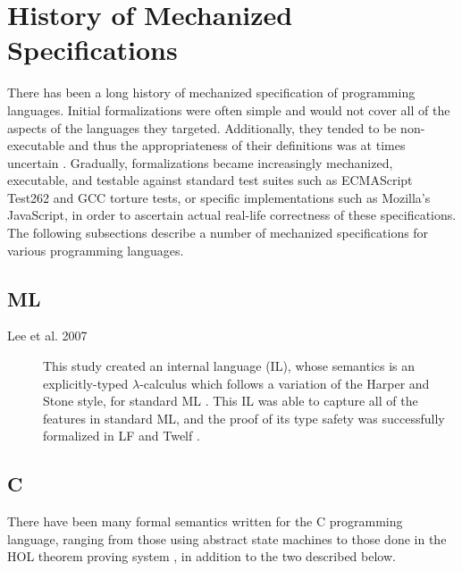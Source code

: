 \documentclass[a4paper,11pt,twoside]{report}
\begin{document}
\section{History of Mechanized Specifications}\label{sec:hist}
There has been a long history of mechanized specification of programming languages. Initial formalizations were often simple and would not cover all of the aspects of the languages they targeted. Additionally, they tended to be non-executable and thus the appropriateness of their definitions was at times uncertain \cite{Ellison:2012}. Gradually, formalizations became increasingly mechanized, executable, and testable against standard test suites such as ECMAScript Test262 and GCC torture tests, or specific implementations such as Mozilla's JavaScript, in order to ascertain actual real-life correctness of these specifications. The following subsections describe a number of mechanized specifications for various programming languages.

\subsection{ML}
\begin{description}
\item[Lee et al. 2007] This study created an internal language (IL), whose semantics is an explicitly-typed $\lambda$-calculus which follows a variation of the Harper and Stone\cite{Harper:2000} style, for standard ML \cite{Lee:2007}. This IL was able to capture all of the features in standard ML, and the proof of its type safety was successfully formalized in LF \cite{Harper:1993} and Twelf \cite{Pfenning98guide}.
\end{description}

\subsection{C}\label{sec:chist}
There have been many formal semantics written for the C programming language, ranging from those using abstract state machines \cite{Gurevich:1992} to those done in the HOL theorem proving system \cite{norrish:1998}, in addition to the two described below.
\end{document}
